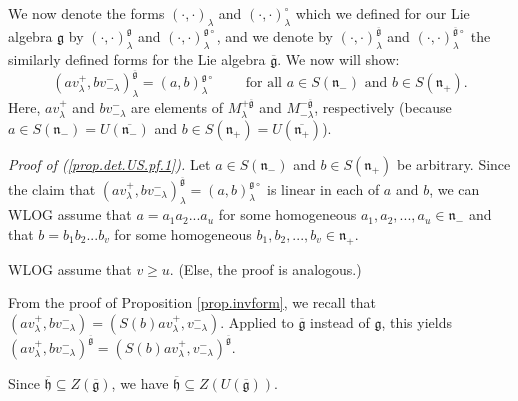 \documentclass
[numbers=enddot,12pt,final,onecolumn,german,notitlepage]{scrartcl}%
\theoremstyle{definition}
\begin{document}
We now denote the forms $\left(  \cdot,\cdot\right)  _{\lambda}$ and $\left(
\cdot,\cdot\right)  _{\lambda}^{\circ}$ which we defined for our Lie algebra
$\mathfrak{g}$ by $\left(  \cdot,\cdot\right)  _{\lambda}^{\mathfrak{g}}$ and
$\left(  \cdot,\cdot\right)  _{\lambda}^{\mathfrak{g}\circ}$, and we denote by
$\left(  \cdot,\cdot\right)  _{\lambda}^{\overline{\mathfrak{g}}}$ and
$\left(  \cdot,\cdot\right)  _{\lambda}^{\overline{\mathfrak{g}}\circ}$ the
similarly defined forms for the Lie algebra $\overline{\mathfrak{g}}$. We now
will show:%
\begin{equation}
\left(  av_{\lambda}^{+},bv_{-\lambda}^{-}\right)  _{\lambda}^{\overline
{\mathfrak{g}}}=\left(  a,b\right)  _{\lambda}^{\mathfrak{g}\circ
}\ \ \ \ \ \ \ \ \ \ \text{for all }a\in S\left(  \mathfrak{n}_{-}\right)
\text{ and }b\in S\left(  \mathfrak{n}_{+}\right)  . \label{prop.det.US.pf.1}%
\end{equation}
Here, $av_{\lambda}^{+}$ and $bv_{-\lambda}^{-}$ are elements of $M_{\lambda
}^{+\overline{\mathfrak{g}}}$ and $M_{-\lambda}^{-\overline{\mathfrak{g}}}$,
respectively (because $a\in S\left(  \mathfrak{n}_{-}\right)  =U\left(
\overline{\mathfrak{n}_{-}}\right)  $ and $b\in S\left(  \mathfrak{n}%
_{+}\right)  =U\left(  \overline{\mathfrak{n}_{+}}\right)  $).

\textit{Proof of (\ref{prop.det.US.pf.1}).} Let $a\in S\left(  \mathfrak{n}%
_{-}\right)  $ and $b\in S\left(  \mathfrak{n}_{+}\right)  $ be arbitrary.
Since the claim that $\left(  av_{\lambda}^{+},bv_{-\lambda}^{-}\right)
_{\lambda}^{\overline{\mathfrak{g}}}=\left(  a,b\right)  _{\lambda
}^{\mathfrak{g}\circ}$ is linear in each of $a$ and $b$, we can WLOG assume
that $a=a_{1}a_{2}...a_{u}$ for some homogeneous $a_{1},a_{2},...,a_{u}%
\in\mathfrak{n}_{-}$ and that $b=b_{1}b_{2}...b_{v}$ for some homogeneous
$b_{1},b_{2},...,b_{v}\in\mathfrak{n}_{+}$.

WLOG assume that $v\geq u$. (Else, the proof is analogous.)

From the proof of Proposition \ref{prop.invform}, we recall that $\left(
av_{\lambda}^{+},bv_{-\lambda}^{-}\right)  =\left(  S\left(  b\right)
av_{\lambda}^{+},v_{-\lambda}^{-}\right)  $. Applied to $\overline
{\mathfrak{g}}$ instead of $\mathfrak{g}$, this yields $\left(  av_{\lambda
}^{+},bv_{-\lambda}^{-}\right)  ^{\overline{\mathfrak{g}}}=\left(  S\left(
b\right)  av_{\lambda}^{+},v_{-\lambda}^{-}\right)  ^{\overline{\mathfrak{g}}%
}$.

Since $\overline{\mathfrak{h}}\subseteq Z\left(  \overline{\mathfrak{g}%
}\right)  $, we have $\overline{\mathfrak{h}}\subseteq Z\left(  U\left(
\overline{\mathfrak{g}}\right)  \right)  $.
\end{document}
